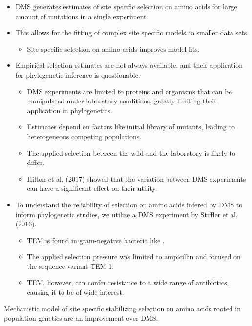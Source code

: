 \documentclass[12pt]{article}
\begin{document}
	\begin{itemize}
		\item DMS generates estimates of site specific selection on amino acids for large amount of mutations in a single experiment.
		\item This allows for the fitting of complex site specific models to smaller data sets.
		\begin{itemize}
			\item Site specific selection on amino acids improves model fits.
		\end{itemize}
		\item Empirical selection estimates are not always available, and their application for phylogenetic inference is questionable.
		\begin{itemize}
			\item DMS experiments are limited to proteins and organisms that can be manipulated under laboratory conditions, greatly limiting their application in phylogenetics.
			\item Estimates depend on factors like initial library of mutants, leading to heterogeneous competing populations.
			\item The applied selection between the wild and the laboratory is likely to differ.
			\item Hilton et al. (2017) showed that the variation between DMS experiments can have a significant effect on their utility.
		\end{itemize}
		\item To understand the reliability of selection on amino acids infered by DMS to inform phylogenetic studies, we utilize a DMS experiment by Stiffler et al. (2016).
		\begin{itemize}
			\item TEM is found in gram-negative bacteria like \ecoli.
			\item The applied selection pressure was limited to ampicillin and focused on the sequence variant TEM-1.
			\item TEM, however, can confer resistance to a wide range of antibiotics, causing it to be of wide interest.
		\end{itemize}
	\end{itemize}
	\item Mechanistic model of site specific stabilizing selection on amino acids rooted in population genetics are an improvement over DMS.
\end{document}
